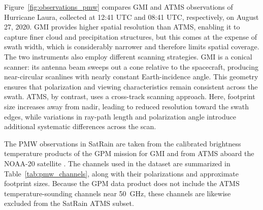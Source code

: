 \documentclass[11pt]{article}
\begin{document}
Figure~\ref{fig:observations_pmw} compares GMI and ATMS observations of
Hurricane Laura, collected at 12:41 UTC and 08:41 UTC, respectively, on August
27, 2020. GMI provides higher spatial resolution than ATMS, enabling it to
capture finer cloud and precipitation structures, but this comes at the expense
of swath width, which is considerably narrower and therefore limits spatial
coverage. The two instruments also employ different scanning strategies. GMI is
a conical scanner: its antenna beam sweeps out a cone relative to the
spacecraft, producing near-circular scanlines with nearly constant
Earth-incidence angle. This geometry ensures that polarization and viewing
characteristics remain consistent across the swath. ATMS, by contrast, uses a
cross-track scanning approach. Here, footprint size increases away from nadir,
leading to reduced resolution toward the swath edges, while variations in
ray-path length and polarization angle introduce additional systematic
differences across the scan.

The PMW observations in SatRain are taken from the calibrated brightness temperature products of the GPM mission for GMI \citep{Berg2022_GMI_L1C_R_V07} and from ATMS aboard the NOAA-20 satellite \citep{Berg2022_ATMS_NOAA20_1C_V07}. The channels used in the dataset are summarized in Table~\ref{tab:pmw_channels}, along with their polarizations and approximate footprint sizes. Because the GPM data product does not include the ATMS temperature-sounding channels near \SI{50}{\giga\hertz}, these channels are likewise excluded from the SatRain ATMS subset.
\end{document}

